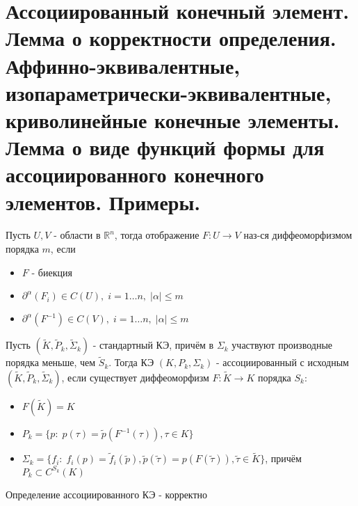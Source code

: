 \documentclass[__main__.tex]{subfiles}
\begin{document}
\section{Ассоциированный конечный элемент. Лемма о корректности определения. Аффинно-эквивалентные, изопараметрически-эквивалентные, криволинейные конечные элементы. Лемма о виде функций формы для ассоциированного конечного элементов. Примеры.}

\begin{definition}[Диффеоморфизм]
	Пусть $U,V$ - области в $\mathbb{R}^n$, тогда отображение $F:U\rightarrow V$ наз-ся диффеоморфизмом порядка $m$, если
	\begin{itemize}
		\item $F$ - биекция
		\item $\partial^\alpha (F_i)\in C(U),\;i=1\dots n,\;\vert\alpha\vert\le m$
		\item $\partial^\alpha (F^{-1})\in C(V),\;i=1\dots n,\;\vert\alpha\vert\le m$
	\end{itemize}
\end{definition}
\begin{definition}[Ассоциированный КЭ]
	Пусть $\left(\tilde{K},\tilde{P}_k,\tilde{\Sigma}_k\right)$ - стандартный КЭ, причём в $\Sigma_k$ участвуют производные порядка меньше, чем $\tilde{S}_k$. Тогда КЭ $\left(K,P_k,\Sigma_k\right)$ - ассоциированный с исходным $\left(\tilde{K},\tilde{P}_k,\tilde{\Sigma}_k\right)$, если существует диффеоморфизм $F:\tilde{K}\rightarrow K$ порядка $S_k$:
	\begin{itemize}
		\item $F(\tilde{K})=K$
		\item $P_k=\{p:\;p(\tau)=\tilde{p}(F^{-1}(\tau)),\tau\in K\}$
		\item $\Sigma_k=\{f_i:\;f_i(p)=\tilde{f}_i(\tilde{p}),\tilde{p}(\tilde{\tau})=p(F(\tilde{\tau})),\tilde{\tau}\in\tilde{K} \}$, причём $P_k\subset C^{S_k}(K)$
	\end{itemize}
\end{definition}
\begin{theorem}
	Определение ассоциированного КЭ - корректно
\end{theorem}
\end{document}
